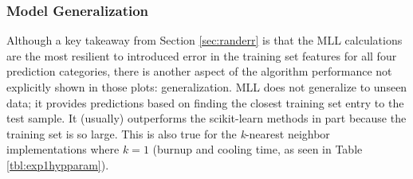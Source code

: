 
\subsubsection{Model Generalization}
\label{sec:randerrC}

Although a key takeaway from Section \ref{sec:randerr} is that the \gls{MLL}
calculations are the most resilient to introduced error in the training set
features for all four prediction categories, there is another aspect of the
algorithm performance not explicitly shown in those plots: generalization.
\Gls{MLL} does not generalize to unseen data; it provides predictions based on
finding the closest training set entry to the test sample.  It (usually)
outperforms the scikit-learn methods in part because the training set is so
large. This is also true for the \textit{k}-nearest neighbor implementations
where $k=1$ (burnup and cooling time, as seen in Table \ref{tbl:exp1hypparam}).


